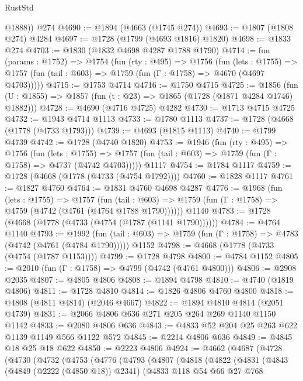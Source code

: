 \begin{lexlean}{RustStd}
\begin{coremodule}
{\begin{coremodule}
{{{{{{{{{{{{{        @1888))
    @274
@4690 := @1894 (@4663 (@1745 @274))
@4693 := @1807 (@1808 @274) @4284
@4697 := @1728 (@1799 (@4693 @1816) @1820)
@4698 := @1833 @274
@4703 := @1830 (@1832 @4698 @4287 @1788 @1790)
@4714 := fun (params : @1752) =>
  @1754
    (fun (rty : @495) =>
    @1756
      (fun (lets : @1755) =>
      @1757 (fun (tail : @603) => @1759 (fun (Γ : @1758) => @4670 (@4697 @4703)))))
@4715 := @1753 @4714
@4716 := @1750 @4715
@4725 := @1856 (fun (U : @1855) => @1857 (fun (t : @23) => @1865 (@1728 (@1871 @4284 @1746) @1882)))
@4728 := @4690 (@4716 @4725) @4282
@4730 := @1713 @4715 @4725
@4732 := @1943 @4714 @1113
@4733 := @1780 @1113
@4737 := @1728 (@4668 (@1778 (@4733 @1793)))
@4739 := @4693 (@1815 @1113)
@4740 := @1799 @4739
@4742 := @1728 (@4740 @1820)
@4753 := @1946
    (fun (rty : @495) =>
    @1756
      (fun (lets : @1755) =>
      @1757 (fun (tail : @603) => @1759 (fun (Γ : @1758) => @4737 (@4742 @4703)))))
    @1117
@4754 := @1784 @1117
@4759 := @1728 (@4668 (@1778 (@4733 (@4754 @1792))))
@4760 := @1828 @1117
@4761 := @1827 @4760
@4764 := @1831 @4760 @4698 @4287
@4776 := @1968
    (fun (lets : @1755) =>
    @1757
      (fun (tail : @603) => @1759 (fun (Γ : @1758) => @4759 (@4742 (@4761 (@4764 @1788 @1790))))))
    @1140
@4783 := @1728 (@4668 (@1778 (@4733 (@4754 (@1787 (@1141 @1790))))))
@4784 := @4764 @1140
@4793 := @1992
    (fun (tail : @603) => @1759 (fun (Γ : @1758) => @4783 (@4742 (@4761 (@4784 @1790)))))
    @1152
@4798 := @4668 (@1778 (@4733 (@4754 (@1787 @1153))))
@4799 := @1728 @4798
@4800 := @4784 @1152
@4805 := @2010 (fun (Γ : @1758) => @4799 (@4742 (@4761 @4800)))
@4806 := @2908 @2035
@4807 := @4805 @4806
@4808 := @1894 @4798
@4810 := @4740 (@1819 @4806)
@4811 := @1728 @4810
@4814 := @1826 @4806 @4760 @4800
@4818 := @4808 (@4811 @4814) (@2046 @4667)
@4822 := @1894 @4810 @4814 (@2051 @4739)
@4831 := @2066 @4806 @636 @271 @205 @264 @269 @1140 @1150 @1142
@4833 := @2080 @4806 @636
@4843 := @4833 @52 @204 @25 @263 @622 @1139 @1149 @566 @1122 @572
@4845 := @2214 @4806 @636
@4849 := @4845 @18 @25 @18 @622
@4850 := @2223 @4806
@4924 := @4662
    (@4687
      (@4728
        (@4730
          (@4732
            (@4753
              (@4776
                (@4793
                  (@4807
                    (@4818
                      (@4822
                        (@4831
                          (@4843
                            (@4849 (@2222 (@4850 @18)) @2341)
                            (@4833
                              @118
                              @54
                              @66
                              @27
                              @768
}}}}}}}}}}}}}
\end{coremodule}}
\end{coremodule}
\end{lexlean}
